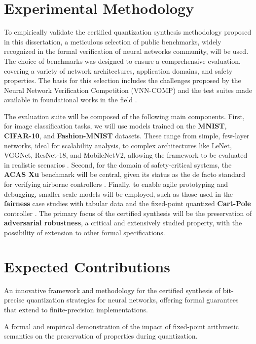 \section{Experimental Methodology}

To empirically validate the certified quantization synthesis methodology proposed in this dissertation, a meticulous selection of public benchmarks, widely recognized in the formal verification of neural networks community, will be used. The choice of benchmarks was designed to ensure a comprehensive evaluation, covering a variety of network architectures, application domains, and safety properties. The basis for this selection includes the challenges proposed by the Neural Network Verification Competition (VNN-COMP) and the test suites made available in foundational works in the field \cite{cordeiro2025neuralnetworkverificationprogramming,abdi2021counterexample}.

The evaluation suite will be composed of the following main components. First, for image classification tasks, we will use models trained on the \textbf{MNIST}, \textbf{CIFAR-10}, and \textbf{Fashion-MNIST} datasets. These range from simple, few-layer networks, ideal for scalability analysis, to complex architectures like LeNet, VGGNet, ResNet-18, and MobileNetV2, allowing the framework to be evaluated in realistic scenarios \cite{han2020understanding, qnsong2023qnnrepairCai2020Certified}. Second, for the domain of safety-critical systems, the \textbf{ACAS Xu} benchmark will be central, given its status as the de facto standard for verifying airborne controllers \cite{katz2017reluplex}. Finally, to enable agile prototyping and debugging, smaller-scale models will be employed, such as those used in the \textbf{fairness} case studies with tabular data and the fixed-point quantized \textbf{Cart-Pole} controller \cite{baranowski2020smt}. The primary focus of the certified synthesis will be the preservation of \textbf{adversarial robustness}, a critical and extensively studied property, with the possibility of extension to other formal specifications.


\section{Expected Contributions}
An innovative framework and methodology for the certified synthesis of bit-precise quantization strategies for neural networks, offering formal guarantees that extend to finite-precision implementations.

A formal and empirical demonstration of the impact of fixed-point arithmetic semantics on the preservation of properties during quantization.

